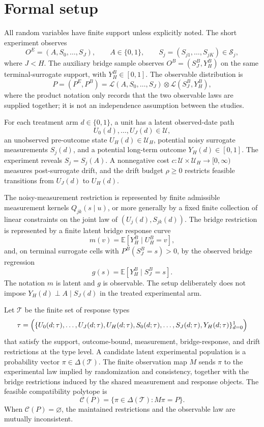 \documentclass[11pt]{article}
\newcommand{\E}{\mathbb{E}}
\theoremstyle{definition}
\theoremstyle{plain}
\theoremstyle{remark}
\begin{document}
\section{Formal setup}
All random variables have finite support unless explicitly noted.  The short experiment observes
\[
  O^E=(A,S_0,\ldots,S_J),
  \qquad A\in\{0,1\},\qquad
  S_j=(S_{j1},\ldots,S_{jK})\in\mathcal S_j,
\]
where \(J<H\).  The auxiliary bridge sample observes \(O^B=(S_J^B,Y_H^B)\) on the same terminal-surrogate support, with \(Y_H^B\in[0,1]\).  The observable distribution is
\[
  P=(P^E,P^B)
  =\mathcal L(A,S_0,\ldots,S_J)\otimes \mathcal L(S_J^B,Y_H^B),
\]
where the product notation only records that the two observable laws are supplied together; it is not an independence assumption between the studies.

For each treatment arm \(d\in\{0,1\}\), a unit has a latent observed-date path
\[
  U_0(d),\ldots,U_J(d)\in\mathcal U,
\]
an unobserved pre-outcome state \(U_H(d)\in\mathcal U_H\), potential noisy surrogate measurements \(S_j(d)\), and a potential long-term outcome \(Y_H(d)\in[0,1]\).  The experiment reveals \(S_j=S_j(A)\).  A nonnegative cost \(c:\mathcal U\times\mathcal U_H\to[0,\infty)\) measures post-surrogate drift, and the drift budget \(\rho\ge0\) restricts feasible transitions from \(U_J(d)\) to \(U_H(d)\).

The noisy-measurement restriction is represented by finite admissible measurement kernels \(Q_{jk}(s\mid u)\), or more generally by a fixed finite collection of linear constraints on the joint law of \((U_j(d),S_{jk}(d))\).  The bridge restriction is represented by a finite latent bridge response curve
\[
  m(v)=\E[Y_H^B\mid U_H^B=v],
\]
and, on terminal surrogate cells with \(P^B(S_J^B=s)>0\), by the observed bridge regression
\[
  g(s)=\E[Y_H^B\mid S_J^B=s].
\]
The notation \(m\) is latent and \(g\) is observable.  The setup deliberately does not impose \(Y_H(d)\perp A\mid S_J(d)\) in the treated experimental arm.

Let \(\mathcal T\) be the finite set of response types
\[
  \tau=\Bigl(
    \{U_0(d;\tau),\ldots,U_J(d;\tau),U_H(d;\tau),
      S_0(d;\tau),\ldots,S_J(d;\tau),Y_H(d;\tau)\}_{d=0}^1
  \Bigr)
\]
that satisfy the support, outcome-bound, measurement, bridge-response, and drift restrictions at the type level.  A candidate latent experimental population is a probability vector \(\pi\in\Delta(\mathcal T)\).  The finite observation map \(M\) sends \(\pi\) to the experimental law implied by randomization and consistency, together with the bridge restrictions induced by the shared measurement and response objects.  The feasible compatibility polytope is
\[
  \mathcal C(P)=\{\pi\in\Delta(\mathcal T): M\pi=P\}.
\]
When \(\mathcal C(P)=\varnothing\), the maintained restrictions and the observable law are mutually inconsistent.
\end{document}
